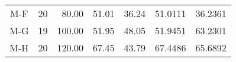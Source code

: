 \begin{table*}[t!]
\begin{tabular}{ccrrrrr}
        M-F         & 20                & 80.00                                                    & 51.01                                                    & 36.24                                    & 51.0111                                          & 36.2361                                          \\
        M-G         & 19                & 100.00                                                   & 51.95                                                    & 48.05                                    & 51.9451                                          & 63.2301                                          \\
        M-H         & 20                & 120.00                                                   & 67.45                                                    & 43.79                                    & 67.4486                                          & 65.6892                                         \\
        \bottomrule
    
    \end{tabular}

\label{tab:adsorcion}
\end{table*}